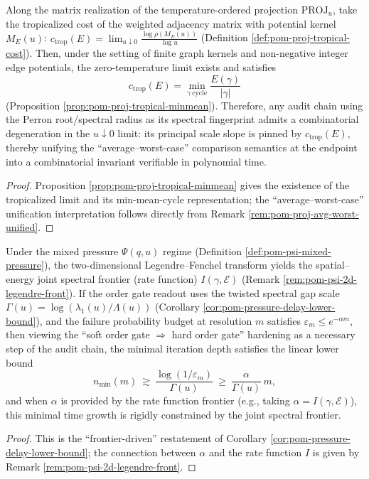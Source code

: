 \begin{theorem}\label{thm:xi-zero-temp-comparability}
Along the matrix realization of the temperature-ordered projection \(\mathrm{PROJ}_u\), take the tropicalized cost of the weighted adjacency matrix with potential kernel \(M_E(u)\):
\(
c_{\mathrm{trop}}(E)=\lim_{u\downarrow 0}\frac{\log\rho(M_E(u))}{\log u}
\)
(Definition \ref{def:pom-proj-tropical-cost}).
Then, under the setting of finite graph kernels and non-negative integer edge potentials, the zero-temperature limit exists and satisfies
\[
c_{\mathrm{trop}}(E)=\min_{\gamma\ \mathrm{cycle}}\frac{E(\gamma)}{|\gamma|}
\]
(Proposition \ref{prop:pom-proj-tropical-minmean}).
Therefore, any audit chain using the Perron root/spectral radius as its spectral fingerprint admits a combinatorial degeneration in the \(u\downarrow 0\) limit: its principal scale slope is pinned by \(c_{\mathrm{trop}}(E)\), thereby unifying the ``average--worst-case'' comparison semantics at the endpoint into a combinatorial invariant verifiable in polynomial time.
\end{theorem}

\begin{proof}
Proposition \ref{prop:pom-proj-tropical-minmean} gives the existence of the tropicalized limit and its min-mean-cycle representation; the ``average--worst-case'' unification interpretation follows directly from Remark \ref{rem:pom-proj-avg-worst-unified}.
\end{proof}

\begin{theorem}\label{thm:xi-hardening-time-frontier-rigidity}
Under the mixed pressure \(\Psi(q,u)\) regime (Definition \ref{def:pom-psi-mixed-pressure}), the two-dimensional Legendre--Fenchel transform yields the spatial--energy joint spectral frontier (rate function) \(I(\gamma,\mathcal{E})\) (Remark \ref{rem:pom-psi-2d-legendre-front}).
If the order gate readout uses the twisted spectral gap scale \(\Gamma(u)=\log(\lambda_1(u)/\Lambda(u))\) (Corollary \ref{cor:pom-pressure-delay-lower-bound}), and the failure probability budget at resolution \(m\) satisfies \(\varepsilon_m\le e^{-\alpha m}\), then viewing the ``soft order gate \(\Rightarrow\) hard order gate'' hardening as a necessary step of the audit chain, the minimal iteration depth satisfies the linear lower bound
\[
n_{\min}(m)\ \gtrsim\ \frac{\log(1/\varepsilon_m)}{\Gamma(u)}\ \ge\ \frac{\alpha}{\Gamma(u)}\,m,
\]
and when \(\alpha\) is provided by the rate function frontier (e.g., taking \(\alpha=I(\gamma,\mathcal{E})\)), this minimal time growth is rigidly constrained by the joint spectral frontier.
\end{theorem}

\begin{proof}
This is the ``frontier-driven'' restatement of Corollary \ref{cor:pom-pressure-delay-lower-bound}; the connection between \(\alpha\) and the rate function \(I\) is given by Remark \ref{rem:pom-psi-2d-legendre-front}.
\end{proof}
